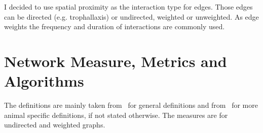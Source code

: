 I decided to use spatial proximity as the interaction type for edges.
Those edges can be directed (e.g. trophallaxis) or undirected, weighted or unweighted. As edge weights the frequency and duration of interactions are commonly used.


\section{Network Measure, Metrics and Algorithms}
\label{sec:definitions}
The definitions are mainly taken from~\textcite{barabasi2016network} for general definitions and from~\textcite{wey2008social} for more animal specific definitions, if not stated otherwise. The measures are for undirected and weighted graphs.


